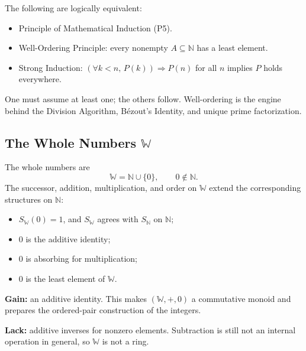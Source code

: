 \begin{remark}
The following are logically equivalent:
\begin{itemize}
  \item Principle of Mathematical Induction (P5).
  \item Well-Ordering Principle: every nonempty $A \subseteq \mathbb{N}$
        has a least element.
  \item Strong Induction: $(\forall k < n,\, P(k)) \Rightarrow P(n)$
        for all $n$ implies $P$ holds everywhere.
\end{itemize}
One must assume at least one; the others follow.
Well-ordering is the engine behind the Division Algorithm, Bézout's Identity,
and unique prime factorization.
\end{remark}

\subsection{The Whole Numbers $\mathbb{W}$}

\begin{tcolorbox}[colback=axiombox, colframe=axiomborder, arc=2pt,
  left=6pt, right=6pt, top=4pt, bottom=4pt,
  title={\small\textbf{$\mathbb{W}$ as $\mathbb{N}$ with an Adjoined Zero}},
  fonttitle=\small\bfseries]
The whole numbers are
\[
\mathbb{W}=\mathbb{N}\cup\{0\},
\qquad 0\notin\mathbb{N}.
\]
The successor, addition, multiplication, and order on $\mathbb{W}$ extend the
corresponding structures on $\mathbb{N}$:
\begin{itemize}
  \item $S_{\mathbb{W}}(0)=1$, and $S_{\mathbb{W}}$ agrees with
        $S_{\mathbb{N}}$ on $\mathbb{N}$;
  \item $0$ is the additive identity;
  \item $0$ is absorbing for multiplication;
  \item $0$ is the least element of $\mathbb{W}$.
\end{itemize}
\end{tcolorbox}

\begin{remark}
\textbf{Gain:} an additive identity. This makes
$(\mathbb{W},+,0)$ a commutative monoid and prepares the ordered-pair
construction of the integers.

\textbf{Lack:} additive inverses for nonzero elements. Subtraction is still
not an internal operation in general, so $\mathbb{W}$ is not a ring.
\end{remark}

